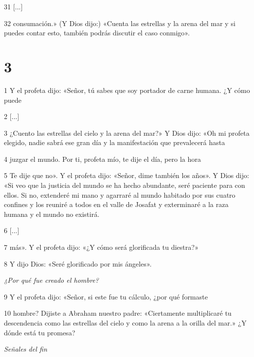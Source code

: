 \par 31 [...]

\par 32 consumación.» (Y Dios dijo:) «Cuenta las estrellas y la arena del mar y si puedes contar esto, también podrás discutir el caso conmigo».

\chapter{3}

\par 1 Y el profeta dijo: «Señor, tú sabes que soy portador de carne humana. ¿Y cómo puede

\par 2 [...]

\par 3 ¿Cuento las estrellas del cielo y la arena del mar?» Y Dios dijo: «Oh mi profeta elegido, nadie sabrá ese gran día y la manifestación que prevalecerá hasta

\par 4 juzgar el mundo. Por ti, profeta mío, te dije el día, pero la hora

\par 5 Te dije que no». Y el profeta dijo: «Señor, dime también los años». Y Dios dijo: «Si veo que la justicia del mundo se ha hecho abundante, seré paciente para con ellos. Si no, extenderé mi mano y agarraré al mundo habitado por sus cuatro confines y los reuniré a todos en el valle de Josafat y exterminaré a la raza humana y el mundo no existirá.

\par 6 [...]

\par 7 más». Y el profeta dijo: «¿Y cómo será glorificada tu diestra?»

\par 8 Y dijo Dios: «Seré glorificado por mis ángeles».

\par \textit{¿Por qué fue creado el hombre?}

\par 9 Y el profeta dijo: «Señor, si este fue tu cálculo, ¿por qué formaste

\par 10 hombre? Dijiste a Abraham nuestro padre: «Ciertamente multiplicaré tu descendencia como las estrellas del cielo y como la arena a la orilla del mar.» ¿Y dónde está tu promesa?

\par \textit{Señales del fin}

